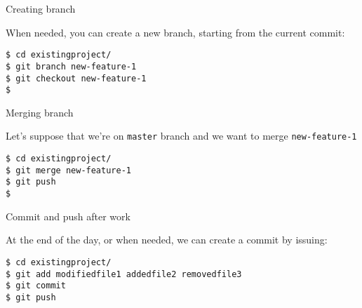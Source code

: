 \begin{frame}[c,fragile]{Creating branch}

When needed, you can create a new branch, starting from the current commit:

\begin{center}
\begin{minipage}{\textwidth}

\begin{listing}[H]
\begin{verbatim}
$ cd existingproject/
$ git branch new-feature-1
$ git checkout new-feature-1
$
\end{verbatim}
\end{listing}

\end{minipage}
\end{center}

\end{frame}


\begin{frame}[c,fragile]{Merging branch}

Let's suppose that we're on \texttt{master} branch and we want to merge \texttt{new-feature-1}

\begin{center}
\begin{minipage}{\textwidth}

\begin{listing}[H]
\begin{verbatim}
$ cd existingproject/
$ git merge new-feature-1
$ git push
$
\end{verbatim}
\end{listing}

\end{minipage}
\end{center}

\end{frame}


\begin{frame}[c,fragile]{Commit and push after work}

At the end of the day, or when needed, we can create a commit by issuing:

\begin{center}
\begin{minipage}{\textwidth}

\begin{listing}[H]
\begin{verbatim}
$ cd existingproject/
$ git add modifiedfile1 addedfile2 removedfile3
$ git commit
$ git push
\end{verbatim}
\end{listing}

\end{minipage}
\end{center}

\end{frame}
